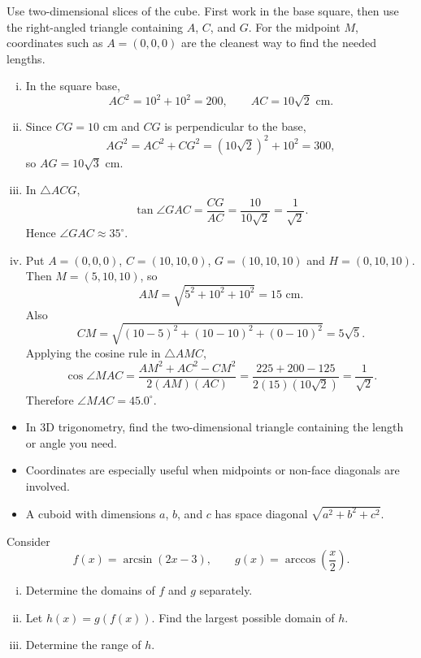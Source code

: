 \begin{hintbox}
Use two-dimensional slices of the cube. First work in the base square, then use
the right-angled triangle containing $A$, $C$, and $G$. For the midpoint $M$,
coordinates such as $A=(0,0,0)$ are the cleanest way to find the needed lengths.
\end{hintbox}

\begin{solution}
\begin{enumerate}[(i)]
  \item In the square base,
  \[
  AC^2 = 10^2+10^2=200,
  \qquad AC=10\sqrt{2}\text{ cm}.
  \]
  \item Since $CG=10$ cm and $CG$ is perpendicular to the base,
  \[
  AG^2=AC^2+CG^2=(10\sqrt2)^2+10^2=300,
  \]
  so $AG=10\sqrt3$ cm.
  \item In $\triangle ACG$,
  \[
  \tan\angle GAC=\frac{CG}{AC}=\frac{10}{10\sqrt2}=\frac1{\sqrt2}.
  \]
  Hence $\angle GAC\approx 35^\circ$.
  \item Put $A=(0,0,0)$, $C=(10,10,0)$, $G=(10,10,10)$ and
  $H=(0,10,10)$. Then $M=(5,10,10)$, so
  \[
  AM=\sqrt{5^2+10^2+10^2}=15\text{ cm}.
  \]
  Also
  \[
  CM=\sqrt{(10-5)^2+(10-10)^2+(0-10)^2}=5\sqrt5.
  \]
  Applying the cosine rule in $\triangle AMC$,
  \[
  \cos\angle MAC
  =\frac{AM^2+AC^2-CM^2}{2(AM)(AC)}
  =\frac{225+200-125}{2(15)(10\sqrt2)}
  =\frac1{\sqrt2}.
  \]
  Therefore $\angle MAC=45.0^\circ$.
\end{enumerate}
\end{solution}

\begin{takeaways}
\begin{itemize}[leftmargin=*]
  \item In 3D trigonometry, find the two-dimensional triangle containing the
        length or angle you need.
  \item Coordinates are especially useful when midpoints or non-face diagonals
        are involved.
  \item A cuboid with dimensions $a$, $b$, and $c$ has space diagonal
        $\sqrt{a^2+b^2+c^2}$.
\end{itemize}
\end{takeaways}

\begin{problem}
Consider
\[
f(x)=\arcsin(2x-3),
\qquad
g(x)=\arccos\!\left(\frac{x}{2}\right).
\]
\begin{enumerate}[(i)]
  \item Determine the domains of $f$ and $g$ separately.
  \item Let $h(x)=g(f(x))$. Find the largest possible domain of $h$.
  \item Determine the range of $h$.
\end{enumerate}
\end{problem}

